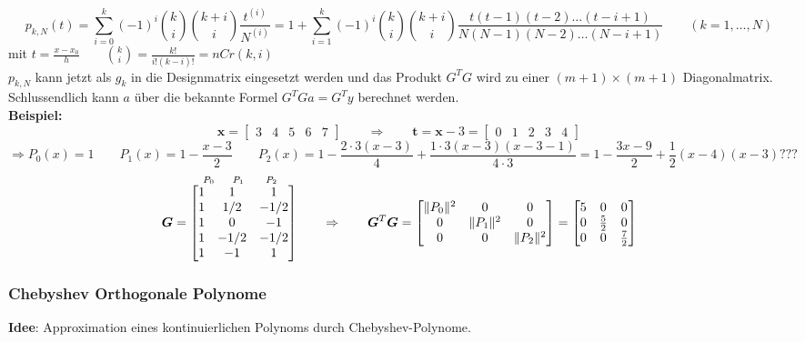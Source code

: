 $$\boxed{p_{k,N}(t) = \sum_{i=0}^k (-1)^i \binom{k}{i} \binom{k+i}{i} \frac{t^{(i)}}{N^{(i)}}= 
1+\sum_{i=1}^k (-1)^i \binom{k}{i} \binom{k+i}{i} \frac{t(t-1)(t-2)\ldots(t-i+1)}{N(N-1)(N-2)\ldots(N-i+1)} \qquad (k = 1,\ldots,N)}$$
mit $t=\frac{x-x_0}{h} \qquad \binom{k}{i}=\frac{k!}{i!(k-i)!}=nCr(k,i)$\\
$p_{k,N}$ kann jetzt als $g_{k}$ in die Designmatrix eingesetzt werden und das Produkt $G^T G$ wird 
zu einer $(m+1)\times(m+1)$ Diagonalmatrix. Schlussendlich kann $a$ über die bekannte Formel
$G^T G a = G^T y$ berechnet werden.\\

\textbf{Beispiel:}
$$\bm{x}=
	   \begin{bmatrix}
			3&4&5&6&7
	   \end{bmatrix}\qquad \Rightarrow\qquad \bm{t}=\bm{x}-3=
	   \begin{bmatrix}
	   		0&1&2&3&4
	   \end{bmatrix}$$
$$\Rightarrow P_0(x)=1 \qquad P_1(x)= 1-\frac{x-3}{2}\qquad P_2(x)=1-\frac{2\cdot 3 (x-3)}{4}+\frac{1 \cdot 3 (x-3)(x-3 -1)}{4 \cdot 3} = 1-\frac{3x-9}{2}+\frac 12 (x-4)(x-3)???$$
$$\overset{\hspace{0.6cm} P_0 \hspace{0.5cm} P_1 \hspace{0.6cm} P_2}{\bm{G} = \begin{bmatrix}
  1 & 1 	& 1\\
  1 & 1/2 	& -1/2\\
  1 & 0	  	& -1\\
  1 & -1/2 	& -1/2\\
  1 & -1 	& 1\\
\end{bmatrix}}\qquad \Rightarrow\qquad
\bm{G}^T\bm{G}=\begin{bmatrix}
 \| P_0\|^2 	& 0 	& 0\\
  0 		& \|P_1\|^2 	& 0\\
  0 		& 0	  	&\|P_2\|^2\\
\end{bmatrix}
= \begin{bmatrix}
  5 & 0 & 0 \\
  0 & \frac52 & 0\\
  0 & 0 & \frac{7} {2}\\
\end{bmatrix}
$$

\newpage
\subsubsection{Chebyshev Orthogonale Polynome} \label{sssec:chebyshev_polynom}
\textbf{Idee}: Approximation eines kontinuierlichen Polynoms durch Chebyshev-Polynome.

